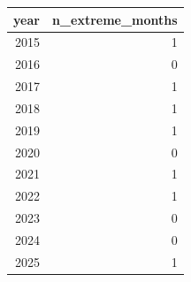\begin{tabular}{rr}
\toprule
year & n\_extreme\_months \\
\midrule
2015 & 1 \\
2016 & 0 \\
2017 & 1 \\
2018 & 1 \\
2019 & 1 \\
2020 & 0 \\
2021 & 1 \\
2022 & 1 \\
2023 & 0 \\
2024 & 0 \\
2025 & 1 \\
\bottomrule
\end{tabular}
